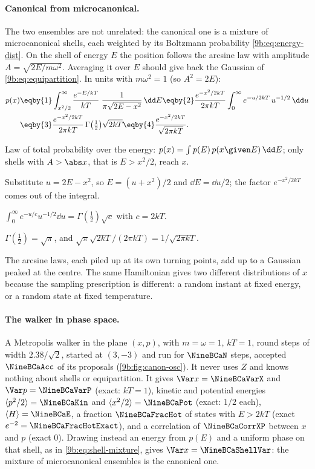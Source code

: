 \paragraph{Canonical from microcanonical.}
The two ensembles are not unrelated: the canonical one is a mixture of microcanonical shells,
each weighted by its Boltzmann probability \eqref{9b:eq:energy-dist}. On the shell of energy $E$
the position follows the arcsine law with amplitude $A=\sqrt{2E/m\omega^2}$. Averaging it over
$E$ should give back the Gaussian of \eqref{9b:eq:equipartition}. In units with $m\omega^2=1$
(so $A^2=2E$):
\begin{align}
  p(x)
  &\eqby{1}\int_{x^2/2}^\infty\frac{e^{-E/kT}}{kT}\;\frac{1}{\pi\sqrt{2E-x^2}}\,\dd E
   \eqby{2}\frac{e^{-x^2/2kT}}{2\pi kT}\int_0^\infty e^{-u/2kT}\,u^{-1/2}\,\dd u
  \nonumber\\
  &\eqby{3}\frac{e^{-x^2/2kT}}{2\pi kT}\,\Gamma\bigl(\tfrac12\bigr)\sqrt{2kT}
   \eqby{4}\frac{e^{-x^2/2kT}}{\sqrt{2\pi kT}} .
  \label{9b:eq:shell-mixture}
\end{align}
\begin{explain}
  \item Law of total probability over the energy: $p(x)=\int p(E)\,p(x\given E)\,\dd E$; only
        shells with $A>\abs x$, that is $E>x^2/2$, reach $x$.
  \item Substitute $u=2E-x^2$, so $E=(u+x^2)/2$ and $\dd E=\dd u/2$; the factor
        $e^{-x^2/2kT}$ comes out of the integral.
  \item $\int_0^\infty e^{-u/c}u^{-1/2}\dd u=\Gamma(\tfrac12)\sqrt c$ with $c=2kT$.
  \item $\Gamma(\tfrac12)=\sqrt\pi$, and $\sqrt\pi\sqrt{2kT}/(2\pi kT)=1/\sqrt{2\pi kT}$.
\end{explain}
The arcsine laws, each piled up at its own turning points, add up to a Gaussian peaked at the
centre. The same Hamiltonian gives two different distributions of $x$ because the sampling
prescription is different: a random instant at fixed energy, or a random state at fixed
temperature.

\paragraph{The walker in phase space.}
A Metropolis walker in the plane $(x,p)$, with $m=\omega=1$, $kT=1$, round steps of width
$2.38/\sqrt2$, started at $(3,-3)$ and run for $\NineBCaN$ steps, accepted $\NineBCaAcc$ of its
proposals (\cref{9b:fig:canon-osc}). It never uses $Z$ and knows nothing about shells or
equipartition. It gives $\Var x=\NineBCaVarX$ and $\Var p=\NineBCaVarP$ (exact: $kT=1$), kinetic
and potential energies $\langle p^2/2\rangle=\NineBCaKin$ and $\langle x^2/2\rangle=\NineBCaPot$
(exact: $1/2$ each), $\langle H\rangle=\NineBCaE$, a fraction $\NineBCaFracHot$ of states with
$E>2kT$ (exact $e^{-2}=\NineBCaFracHotExact$), and a correlation of $\NineBCaCorrXP$ between $x$
and $p$ (exact 0). Drawing instead an energy from $p(E)$ and a uniform phase on that shell, as in
\eqref{9b:eq:shell-mixture}, gives $\Var x=\NineBCaShellVar$: the mixture of microcanonical
ensembles is the canonical one.

